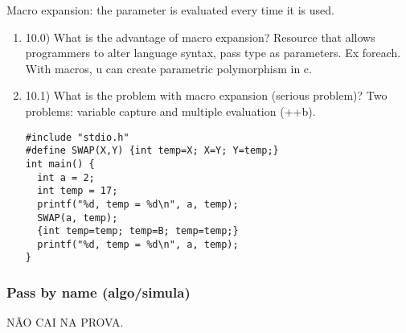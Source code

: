 \documentclass[11pt]{article}
\begin{document}
Macro expansion: the parameter is evaluated every time it is used.
\begin{enumerate}
\item 10.0) What is the advantage of macro expansion?
\label{sec:org27880f6}
Resource that allows programmers to alter language syntax, pass type as
parameters. Ex foreach. With macros, u can create parametric polymorphism in c.
\item 10.1) What is the problem with macro expansion (serious problem)?
\label{sec:org1ff5efa}
Two problems: variable capture and multiple evaluation (++b).
\begin{verbatim}
#include "stdio.h"
#define SWAP(X,Y) {int temp=X; X=Y; Y=temp;}
int main() {
  int a = 2;
  int temp = 17;
  printf("%d, temp = %d\n", a, temp);
  SWAP(a, temp);
  {int temp=temp; temp=B; temp=temp;}
  printf("%d, temp = %d\n", a, temp);
}
\end{verbatim}
\end{enumerate}
\subsubsection{Pass by name (algo/simula)}
\label{sec:org9eb606c}
NÃO CAI NA PROVA.
\end{document}
